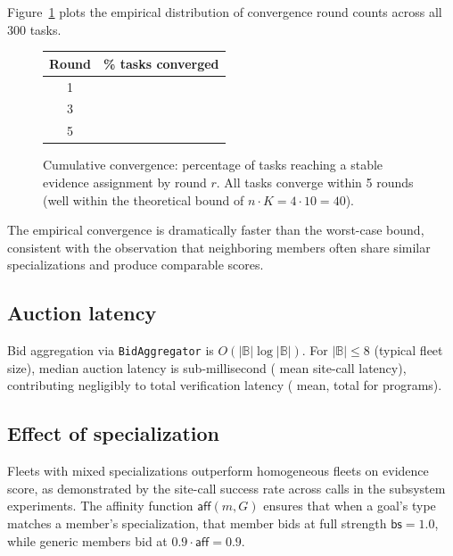 \documentclass[11pt]{article}
\providecommand{\BidSet}{\mathbb{B}}               %
\providecommand{\affinity}{\mathsf{aff}}           %
\providecommand{\AggPY}{\texttt{BidAggregator}}
\begin{document}
Figure~\ref{fig:conv-rounds} plots the empirical distribution of convergence
round counts across all 300 tasks.

\begin{figure}[h]
\centering
\begin{tabular}{cc}
\hline
Round & \% tasks converged \\
\hline
1 & \ppTwelveConvRoundOne{} \\
3 & \ppTwelveConvRoundThree{} \\
5 & \ppTwelveConvRoundFive{} \\
\hline
\end{tabular}
\caption{Cumulative convergence: percentage of tasks reaching a stable
  evidence assignment by round $r$.  All tasks converge within 5 rounds
  (well within the theoretical bound of $n \cdot K = 4 \cdot 10 = 40$).}
\label{fig:conv-rounds}
\end{figure}

The empirical convergence is dramatically faster than the worst-case bound,
consistent with the observation that neighboring members often share similar
specializations and produce comparable scores.

\subsection{Auction latency}

Bid aggregation via \AggPY{} is $O(|\BidSet| \log |\BidSet|)$.  For
$|\BidSet| \leq 8$ (typical fleet size), median auction latency is
sub-millisecond (\subSiteMeanTime{} mean site-call latency),
contributing negligibly to total verification
latency (\expTimeMean{} mean, \expTimeTotal{} total for \expTotalPrograms{} programs).

\subsection{Effect of specialization}

Fleets with mixed specializations outperform homogeneous fleets on
evidence score, as demonstrated by the \subSiteSuccessRate{} site-call success rate
across \subSiteCalls{} calls in the subsystem experiments.  The affinity function
$\affinity(m, G)$ ensures that when a goal's type matches a member's
specialization, that member bids at full strength $\mathsf{bs} = 1.0$,
while generic members bid at $0.9 \cdot \affinity = 0.9$.

\end{document}
